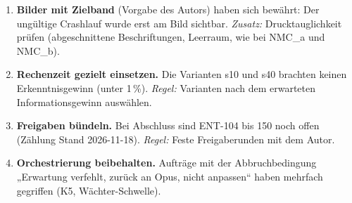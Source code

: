 \documentclass[10pt,a4paper]{article}
\begin{document}
\begin{enumerate}[nosep]
\item \textbf{Bilder mit Zielband} (Vorgabe des Autors) haben sich bewährt: Der ungültige Crashlauf wurde erst am Bild sichtbar. \emph{Zusatz:} Drucktauglichkeit prüfen (abgeschnittene Beschriftungen, Leerraum, wie bei NMC\_a und NMC\_b).
\item \textbf{Rechenzeit gezielt einsetzen.} Die Varianten s10 und s40 brachten keinen Erkenntnisgewinn (unter 1\,\%). \emph{Regel:} Varianten nach dem erwarteten Informationsgewinn auswählen.
\item \textbf{Freigaben bündeln.} Bei Abschluss sind ENT-104 bis 150 noch offen (Zählung Stand 2026-11-18). \emph{Regel:} Feste Freigaberunden mit dem Autor.
\item \textbf{Orchestrierung beibehalten.} Aufträge mit der Abbruchbedingung „Erwartung verfehlt, zurück an Opus, nicht anpassen“ haben mehrfach gegriffen (K5, Wächter-Schwelle).
\end{enumerate}
\end{document}

